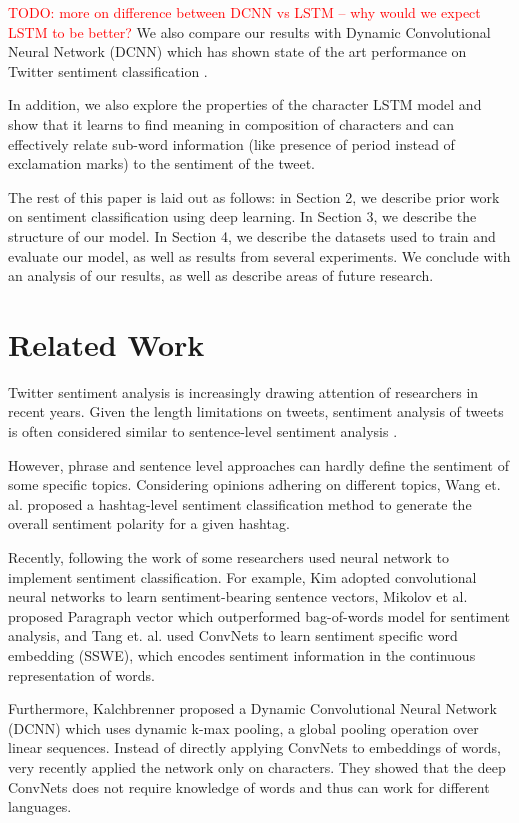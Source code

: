 \documentclass{article} %
\newcommand{\todo}[1]{\textcolor{red}{TODO: #1}}
\begin{document}
\todo{more on difference between DCNN vs LSTM -- why would we expect LSTM to be better?}
We also compare our results with Dynamic Convolutional Neural Network (DCNN) \cite{kalchbrenner2014convolutional} which has shown state of the art performance on Twitter sentiment classification \cite{severynunitn}.

In addition, we also explore the properties of the character LSTM model and show that it learns to find meaning in composition of characters and can effectively relate sub-word information (like presence of period instead of exclamation marks) to the sentiment of the tweet.

The rest of this paper is laid out as follows: in Section 2, we describe prior work on sentiment classification using deep learning. In Section 3, we describe the structure of our model. In Section 4, we describe the datasets used to train and evaluate our model, as well as results from several experiments. We conclude with an analysis of our results, as well as describe areas of future research.


\section{Related Work}
Twitter sentiment analysis is increasingly drawing attention of researchers in recent years. 
Given the length limitations on tweets, sentiment analysis of tweets is often considered similar to sentence-level sentiment analysis \cite{kouloumpis2011twitter}.

However, phrase and sentence level approaches can hardly define the sentiment of some specific topics. Considering opinions adhering on different topics, Wang et. al. \cite{wang2011topic} proposed a hashtag-level sentiment classification method  to generate the overall sentiment polarity for a given hashtag.

Recently, following the work of \cite{mikolov2013efficient} some researchers used neural network to implement sentiment classification. For example, Kim \cite{kim2014convolutional} adopted convolutional neural networks to learn sentiment-bearing sentence vectors, Mikolov et al. \cite{mikolov2013distributed} proposed Paragraph vector which outperformed bag-of-words model for sentiment analysis, and Tang et. al. \cite{tang2014learning} used ConvNets to learn sentiment specific word embedding (SSWE), which encodes sentiment information in the continuous representation of words.

Furthermore, Kalchbrenner \cite{kalchbrenner2014convolutional} proposed a Dynamic Convolutional Neural Network (DCNN) which uses dynamic k-max pooling, a global pooling operation over linear sequences.
Instead of directly applying ConvNets to embeddings of words, very recently \cite{zhang2015character} applied the network only on characters. They showed that the deep ConvNets does not require knowledge of words and thus can work for different languages.
\end{document}
